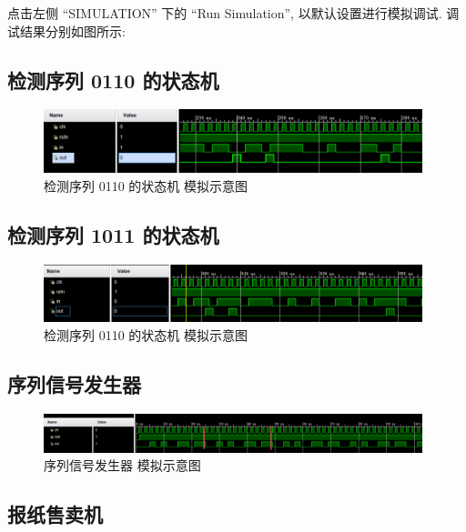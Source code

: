 \documentclass{article}
\begin{document}
点击左侧 ``SIMULATION'' 下的 ``Run Simulation'', 以默认设置进行模拟调试. 调试结果分别如图所示:

\subsection{检测序列 0110 的状态机}

\begin{figure}[H]
    \centering
    \includegraphics[width=0.98\textwidth]{assets/fsm_1.png}
    \caption{检测序列 0110 的状态机 模拟示意图}
\end{figure}

\subsection{检测序列 1011 的状态机}

\begin{figure}[H]
    \centering
    \includegraphics[width=0.98\textwidth]{assets/fsm_2.png}
    \caption{检测序列 0110 的状态机 模拟示意图}
\end{figure}

\subsection{序列信号发生器}

\begin{figure}[H]
    \centering
    \includegraphics[width=0.98\textwidth]{assets/sequence_signal_generator.png}
    \caption{序列信号发生器 模拟示意图}
\end{figure}

\subsection{报纸售卖机}
\end{document}
